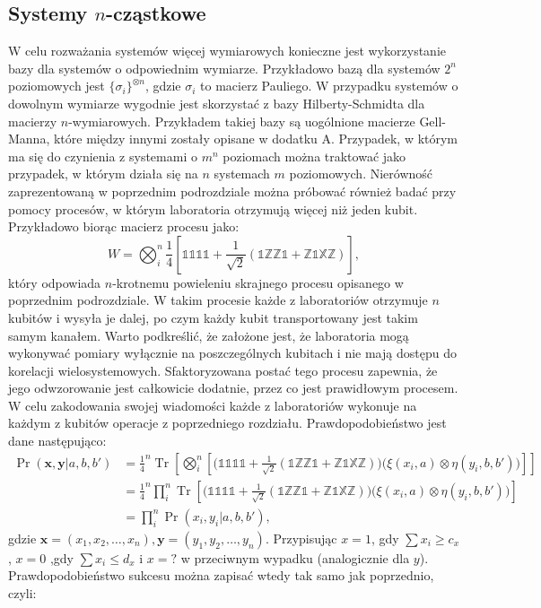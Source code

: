 \documentclass[10pt]{article} %
\DeclareMathOperator{\Trs}{Tr}
\newcommand{\X}{\mathbb{X}}
\newcommand{\Z}{\mathbb{Z}}
\newcommand{\I}{\mathbb{1}}
\begin{document}
\subsection{Systemy $n$-cząstkowe}
W celu rozważania systemów więcej wymiarowych konieczne jest wykorzystanie bazy dla systemów o odpowiednim wymiarze. Przykładowo bazą dla systemów
$2^n$ poziomowych jest $\{ \sigma_i \}^{\otimes n}$, gdzie $\sigma_i$ to macierz Pauliego. W przypadku systemów o dowolnym wymiarze wygodnie jest
skorzystać z bazy Hilberty-Schmidta dla macierzy $n$-wymiarowych. Przykładem takiej bazy są uogólnione macierze Gell-Manna, które między innymi zostały opisane
w dodatku A. Przypadek, w którym ma się do czynienia z systemami o $m^n$ poziomach można traktować jako przypadek, w którym działa się na $n$ systemach
$m$ poziomowych. Nierówność zaprezentowaną w poprzednim podrozdziale można próbować również badać przy pomocy procesów, w którym laboratoria otrzymują więcej niż jeden kubit. Przykładowo biorąc macierz procesu jako:
\begin{equation}
W =  \bigotimes_i^{n}\frac{1}{4}\left[ \I\I\I\I + \frac{1}{\sqrt{2}}\left( \I\Z\Z\I + \Z\I\X\Z \right) \right],
\end{equation} który odpowiada $n$-krotnemu powieleniu skrajnego procesu opisanego w poprzednim podrozdziale. W takim procesie każde z laboratoriów otrzymuje
$n$ kubitów i wysyła je dalej, po czym każdy kubit transportowany jest takim samym kanałem. Warto podkreślić, że założone jest, że laboratoria mogą wykonywać pomiary wyłącznie na poszczególnych kubitach i nie mają dostępu do korelacji wielosystemowych. 
Sfaktoryzowana postać tego procesu zapewnia, że jego odwzorowanie jest całkowicie dodatnie, przez co jest prawidłowym procesem.
W celu zakodowania swojej wiadomości każde z laboratoriów wykonuje na każdym z kubitów operacje z poprzedniego rozdziału. Prawdopodobieństwo jest dane następująco:
\begin{equation}
\begin{split}
\Pr(\mathbf{x}, \mathbf{y} | a, b, b') &= \frac{1}{4}^n\Trs \left[ \bigotimes_i^{n}\left[\Big( \I\I\I\I + \frac{1}{\sqrt{2}} \left( \I\Z\Z\I + \Z\I\X\Z\right)\Big)\Big(\xi(x_i,a) \otimes \eta(y_i, b, b')\Big)\right]\right] \\
&= \frac{1}{4}^n \prod_i^n \Trs\left[ \Big( \I\I\I\I  + \frac{1}{\sqrt{2}} \left( \I\Z\Z\I + \Z\I\X\Z\right)\Big) \Big( \xi(x_i,a) \otimes \eta(y_i, b, b')\Big) \right] \\
&= \prod_i^n \Pr(x_i,y_i |a, b, b'),
\end{split}
\end{equation} gdzie $\mathbf{x} = (x_1, x_2,\dots,x_n), \mathbf{y} = (y_1, y_2, \dots, y_n)$. Przypisując $x=1$, gdy $\sum x_i \geq c_x$, $x=0$  ,gdy $\sum x_i \leq d_x$ i $x=?$ w przeciwnym wypadku (analogicznie dla $y$). Prawdopodobieństwo sukcesu można zapisać wtedy tak samo jak poprzednio, czyli:
\end{document}
